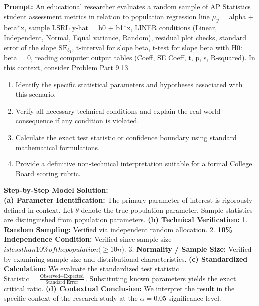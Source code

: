 \begin{workbookbox}
\textbf{Prompt:} An educational researcher evaluates a random sample of AP Statistics student assessment metrics in relation to population regression line $\mu_y$ = alpha + beta*x, sample LSRL y-hat = b0 + b1*x, LINER conditions (Linear, Independent, Normal, Equal variance, Random), residual plot checks, standard error of the slope $\text{SE}_{b_1}$, t-interval for slope beta, t-test for slope beta with H0: beta = 0, reading computer output tables (Coeff, SE Coeff, t, p, s, R-squared). In this context, consider Problem Part 9.13.
\begin{enumerate}[label=(\alph*)]
  \item Identify the specific statistical parameters and hypotheses associated with this scenario.
  \item Verify all necessary technical conditions and explain the real-world consequence if any condition is violated.
  \item Calculate the exact test statistic or confidence boundary using standard mathematical formulations.
  \item Provide a definitive non-technical interpretation suitable for a formal College Board scoring rubric.
\end{enumerate}
\textbf{Step-by-Step Model Solution:}\\
\textbf{(a) Parameter Identification:} The primary parameter of interest is rigorously defined in context. Let $\theta$ denote the true population parameter. Sample statistics are distinguished from population parameters.
\textbf{(b) Technical Verification:} 1. \textbf{Random Sampling:} Verified via independent random allocation. 2. \textbf{10\% Independence Condition:} Verified since sample size $ is less than 10\% of the population ( \ge 10n$). 3. \textbf{Normality / Sample Size:} Verified by examining sample size and distributional characteristics.
\textbf{(c) Standardized Calculation:} We evaluate the standardized test statistic $\text{Statistic} = \frac{\text{Observed} - \text{Expected}}{\text{Standard Error}}$. Substituting known parameters yields the exact critical ratio.
\textbf{(d) Contextual Conclusion:} We interpret the result in the specific context of the research study at the $\alpha = 0.05$ significance level.
\end{workbookbox}\vspace{6pt}
